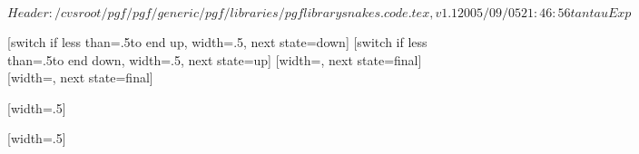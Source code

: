 \ProvidesPackageRCS[v\pgfversion] $Header: /cvsroot/pgf/pgf/generic/pgf/libraries/pgflibrarysnakes.code.tex,v 1.1 2005/09/05 21:46:56 tantau Exp $

%


\newdimen\pgfsnakewaveamplitude
\newdimen\pgfsnakewavelength
\pgfsnakewavelength=10pt
\pgfsnakewaveamplitude=2.5pt


%

{
  [switch if less than=.5\pgfsnakewavelength to end up,%
             width=.5\pgfsnakewavelength,%
             next state=down]
  {
    \pgfpathlineto{\pgfpoint{.25\pgfsnakewavelength}{\pgfsnakewaveamplitude}}
    \pgfpathlineto{\pgfpoint{.5\pgfsnakewavelength}{0pt}}
  }
  [switch if less than=.5\pgfsnakewavelength to end down,%
               width=.5\pgfsnakewavelength,%
               next state=up]
  {
    \pgfpathlineto{\pgfpoint{.25\pgfsnakewavelength}{-\pgfsnakewaveamplitude}}
    \pgfpathlineto{\pgfpoint{.5\pgfsnakewavelength}{0pt}}
  }
  [width=\pgfsnakeremainingdistance,
                 next state=final]
  {
    \pgfpathlineto{\pgfpoint{.5\pgfsnakeremainingdistance}{.5\pgfsnakeremainingdistance}}
    \pgfpathlineto{\pgfpoint{\pgfsnakeremainingdistance}{0pt}}
  }
  [width=\pgfsnakeremainingdistance,
                   next state=final]
  {
    \pgfpathlineto{\pgfpoint{.5\pgfsnakeremainingdistance}{-.5\pgfsnakeremainingdistance}}
    \pgfpathlineto{\pgfpoint{\pgfsnakeremainingdistance}{0pt}}
  }
}



%

{
  [width=.5\pgfsnakewavelength]
  {
    \pgfpathlineto{\pgfpoint{.5\pgfsnakewavelength}{2\pgfsnakewaveamplitude}}
    \pgfpathlineto{\pgfpoint{.5\pgfsnakewavelength}{0pt}}
  }
  {
    \pgfpathlineto{\pgfpoint{\pgfsnakeremainingdistance}{0pt}}
  }
}



%

{
  [width=.5\pgfsnakewavelength]
  {
    \pgfpathcurveto
    {\pgfpoint{0pt}{.555\pgfsnakewaveamplitude}}
    {\pgfpoint{0.11125\pgfsnakewavelength}{\pgfsnakewaveamplitude}}
    {\pgfpoint{.25\pgfsnakewavelength}{\pgfsnakewaveamplitude}}
    \pgfpathcurveto
    {\pgfpoint{.38875\pgfsnakewavelength}{\pgfsnakewaveamplitude}}
    {\pgfpoint{.5\pgfsnakewavelength}{.5\pgfsnakewaveamplitude}}
    {\pgfpoint{.5\pgfsnakewavelength}{0\pgfsnakewaveamplitude}}
  }
  {
    \pgfpathlineto{\pgfpoint{\pgfsnakeremainingdistance}{0pt}}
  }
}



